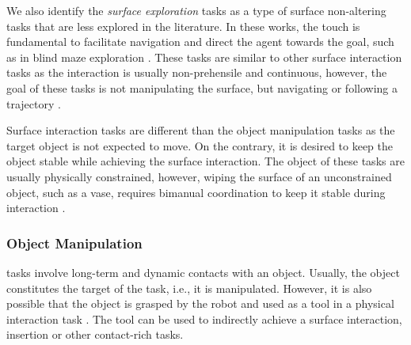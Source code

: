 \documentclass[Afour,sageh,times]{template/sagej}
\begin{document}
We also identify the \textit{surface exploration} tasks as a type of surface non-altering tasks that are less explored in the literature.
In these works, the touch is fundamental to facilitate navigation and direct the agent towards the goal, such as in blind maze exploration \citep{zhang2024srl,375}.
These tasks are similar to other surface interaction tasks as the interaction is usually non-prehensile and continuous, however, the goal of these tasks is not manipulating the surface, but navigating or following a trajectory \citep{90}. 

Surface interaction tasks are different than the object manipulation tasks as the target object is not expected to move.
On the contrary, it is desired to keep the object stable while achieving the surface interaction. 
The object of these tasks are usually physically constrained, however, wiping the surface of an unconstrained object, such as a vase, requires bimanual coordination to keep it stable during interaction \citep{6}.

\subsubsection{Object Manipulation} \label{sec:task-object} tasks involve long-term and dynamic contacts with an object. Usually, the object constitutes the target of the task, i.e., it is manipulated. However, it is also possible that the object is grasped by the robot and used as a tool in a physical interaction task \citep{196}. The tool can be used to indirectly achieve a surface interaction, insertion or other contact-rich tasks.
\end{document}
